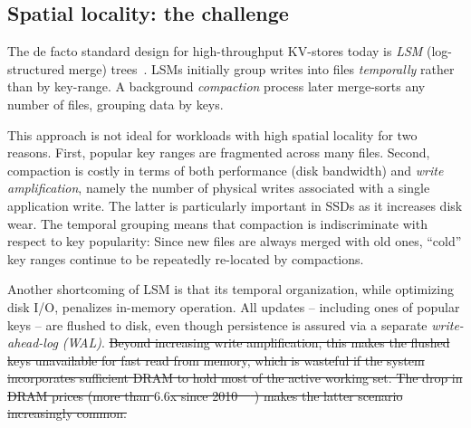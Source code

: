 \documentclass[sigplan,10pt]{acmart}
\providecommand{\DIFdel}[1]{{\protect\color{red}\sout{#1}}}                      %
\providecommand{\DIFdelbegin}{} %
\providecommand{\DIFdelend}{} %
\begin{document}
\subsection{Spatial locality: the challenge}  
\label{ssec:B-tree-compare}



The de facto standard design for high-throughput KV-stores today is \emph{LSM} (log-structured merge) trees~\cite{DBLP:journals/acta/ONeilCGO96}. 
LSMs initially group writes  into files \emph{temporally} rather than by key-range. 
A background \emph{compaction} process later merge-sorts any number of files, grouping data by keys. 

This approach is not ideal for workloads with high spatial locality for two reasons. 
First,  popular key ranges are fragmented across many files. 
Second,  compaction  is costly in terms of  both performance 
(disk bandwidth) and \emph{write amplification}, namely the number of physical writes 
associated with a single application write. The latter is  particularly important in SSDs as it increases disk wear. 
The temporal grouping means that compaction is indiscriminate with respect to key popularity:  
Since new  files are always merged with old ones, 
 ``cold'' key ranges  continue to be repeatedly re-located by  compactions.  

Another shortcoming of LSM is that its temporal organization, while optimizing disk I/O,  penalizes in-memory operation. 
All updates -- including ones of popular keys -- are flushed to disk, even though persistence is assured via a separate \emph{write-ahead-log (WAL)}.
\DIFdelbegin \DIFdel{Beyond increasing write amplification, this makes the flushed keys unavailable for fast read from memory,
which is  wasteful if the system incorporates sufficient DRAM to hold most of the active working set. 
The drop in DRAM prices (more than $6.6$x since 2010~\mbox{%
\cite{dram-prices}}\hspace{0pt}%
) makes the latter scenario increasingly common.  
}\DIFdelend %
\end{document}
